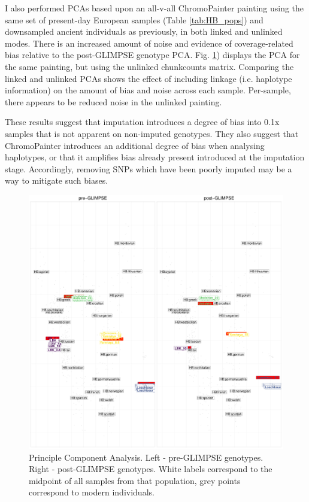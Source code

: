 I also performed PCAs based upon an all-v-all ChromoPainter painting using the same set of present-day European samples (Table \ref{tab:HB_pops}) and downsampled ancient individuals as previously, in both linked and unlinked modes. There is an increased amount of noise and evidence of coverage-related bias relative to the post-GLIMPSE genotype PCA. Fig. \ref{fig:pre_GLIMPSE_PCA}) displays the PCA for the same painting, but using the unlinked chunkcounts matrix. Comparing the linked and unlinked PCAs shows the effect of including linkage (i.e. haplotype information) on the amount of bias and noise across each sample. Per-sample, there appears to be reduced noise in the unlinked painting.

These results suggest that imputation introduces a degree of bias into 0.1x samples that is not apparent on non-imputed genotypes. They also suggest that ChromoPainter introduces an additional degree of bias when analysing haplotypes, or that it amplifies bias already present introduced at the imputation stage. Accordingly, removing SNPs which have been poorly imputed may be a way to mitigate such biases.

\begin{figure}[htp]
    \centering
    \includegraphics[width=1.0\textwidth]{../images/chapter1/pre_post_GLIMPSE_PCA.pdf}
    \caption{Principle Component Analysis. Left - pre-GLIMPSE genotypes. Right - post-GLIMPSE genotypes. White labels correspond to the midpoint of all samples from that population, grey points correspond to modern individuals.}
    \label{fig:pre_GLIMPSE_PCA}
\end{figure}


